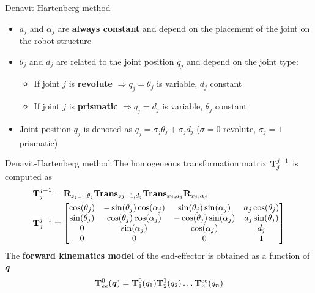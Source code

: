 \begin{frame}{Denavit-Hartenberg method}
	\begin{itemize}
		\item $a_j$ and $\alpha_j$ are \textbf{always constant} and depend on the placement of the joint on the robot structure
		\item $\theta_j$ and $d_j$ are related to the joint position $q_j$ and depend on the joint type:
		\begin{itemize}
			\item If joint $j$ is \textbf{revolute} $ \Rightarrow q_j=\theta_j$ is variable, $d_j$ constant
			\item If joint $j$ is \textbf{prismatic} $ \Rightarrow q_j=d_j$ is variable, $\theta_j$ constant
		\end{itemize} 
		\item Joint position $q_j$ is denoted as $q_j=\overline{\sigma}_j\theta_j+\sigma_jd_j$ ($\sigma=0$ revolute, $\sigma_j=1$ prismatic) 
	\end{itemize} 	
\end{frame}
\begin{frame}{Denavit-Hartenberg method}
	The homogeneous transformation matrix $\mathbf{T}_{j}^{j-1}$ is computed as 
	\begin{align*}
		\mathbf{T}_{j}^{j-1} &= \mathbf{R}_{z_{j-1},\theta_j}\mathbf{Trans}_{z{j-1},d_j}\mathbf{Trans}_{x_j,a_j}\mathbf{R}_{x_j,\alpha_j}\\
		\mathbf{T}_{j}^{j-1} &= \begin{bmatrix}
			\cos(\theta_j)&-\sin(\theta_j)\cos(\alpha_j) &\sin(\theta_j)\sin(\alpha_j) & a_j\cos(\theta_j)\\
			\sin(\theta_j)&\cos(\theta_j)\cos(\alpha_j) &-\cos(\theta_j)\sin(\alpha_j) & a_j\sin(\theta_j)\\
			0&\sin(\alpha_j)&\cos(\alpha_j)&d_j\\
			0&0&0&1
		\end{bmatrix}
	\end{align*}
	The \textbf{forward kinematics model} of the end-effector is obtained as a function of $\bm{q}$
	\begin{equation*}
		\mathbf{T}_{ee}^{0}(\bm{q}) = \mathbf{T}_{1}^{0}(q_1) \mathbf{T}_{2}^{1}(q_2)\ldots\mathbf{T}_{n}^{ee}(q_{n})
	\end{equation*}
\end{frame}
